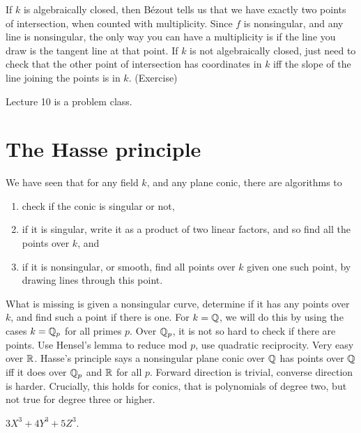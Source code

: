 \begin{note*}
If $ k $ is algebraically closed, then Bézout tells us that we have exactly two points of intersection, when counted with multiplicity. Since $ f $ is nonsingular, and any line is nonsingular, the only way you can have a multiplicity is if the line you draw is the tangent line at that point. If $ k $ is not algebraically closed, just need to check that the other point of intersection has coordinates in $ k $ iff the slope of the line joining the points is in $ k $. (Exercise)
\end{note*}


Lecture 10 is a problem class.

\pagebreak

\section{The Hasse principle}


We have seen that for any field $ k $, and any plane conic, there are algorithms to
\begin{enumerate}
\item check if the conic is singular or not,
\item if it is singular, write it as a product of two linear factors, and so find all the points over $ k $, and
\item if it is nonsingular, or smooth, find all points over $ k $ given one such point, by drawing lines through this point.
\end{enumerate}
What is missing is given a nonsingular curve, determine if it has any points over $ k $, and find such a point if there is one. For $ k = \mathbb{Q} $, we will do this by using the cases $ k = \mathbb{Q}_p $ for all primes $ p $. Over $ \mathbb{Q}_p $, it is not so hard to check if there are points. Use Hensel's lemma to reduce mod $ p $, use quadratic reciprocity. Very easy over $ \mathbb{R} $. Hasse's principle says a nonsingular plane conic over $ \mathbb{Q} $ has points over $ \mathbb{Q} $ iff it does over $ \mathbb{Q}_p $ and $ \mathbb{R} $ for all $ p $. Forward direction is trivial, converse direction is harder. Crucially, this holds for conics, that is polynomials of degree two, but not true for degree three or higher.

\begin{example*}
$ 3X^3 + 4Y^3 + 5Z^3 $.
\end{example*}

